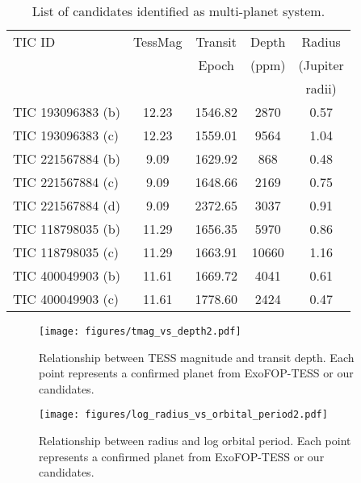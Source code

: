 \begin{table}
    \centering
	\vspace{5mm}
	\caption{List of candidates identified as multi-planet system.}
	\label{tab:multiplanet_candidates}
	\vspace{4mm}
	\begin{tabular}{lcccc} 
		\hline
		\hline
        TIC ID  & TessMag  & Transit & Depth &  Radius\\
		 & & Epoch& (ppm) & (Jupiter\\
		&&&& radii)\\
        \hline
        TIC 193096383 (b)&12.23&1546.82&2870&0.57\\
        TIC 193096383 (c)&12.23&1559.01&9564&1.04\\
        TIC 221567884 (b)&9.09&1629.92&868&0.48\\
        TIC 221567884 (c)&9.09&1648.66&2169&0.75\\
        TIC 221567884 (d)&9.09&2372.65&3037&0.91\\
        TIC 118798035 (b)&11.29&1656.35&5970&0.86\\
        TIC 118798035 (c)&11.29&1663.91&10660&1.16\\
        TIC 400049903 (b)&11.61&1669.72&4041&0.61\\
        TIC 400049903 (c)&11.61&1778.60&2424&0.47\\
        \hline
        \hline		
	\end{tabular}
	\vspace{3mm}
\end{table}




\begin{figure}
\begin{center}
\vspace{5mm}
\texttt{[image: figures/tmag\_vs\_depth2.pdf]}
\vspace{-2mm} 
\caption{\label{fig:tmag_vs_depth}
Relationship between TESS magnitude and transit depth. Each point represents a confirmed planet from ExoFOP-TESS or our candidates.}
\vspace{-1mm}
\end{center}
\end{figure}


\begin{figure}
\begin{center}
\vspace{5mm}
\texttt{[image: figures/log\_radius\_vs\_orbital\_period2.pdf]}
\vspace{-2mm} 
\caption{\label{fig:log_radius_vs_orbital_period}
Relationship between radius and log orbital period. Each point represents a confirmed planet from ExoFOP-TESS or our candidates.}
\vspace{-1mm}
\end{center}
\end{figure}

